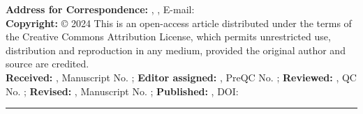 \documentclass{article} %
\begin{document}
\begin{justify} %
\fontsize{8.5}{10.2}\selectfont

\color{Light_navy_blue}\textbf{Address for Correspondence:}  
\color{Black}, ,
E-mail: \href{mailto:\VAR{email}}{} \\

\color{Light_navy_blue}\textbf{Copyright:} 
\color{Black}© 2024  This is an open-access article distributed under the terms of the Creative Commons Attribution License, which permits unrestricted use, distribution and reproduction in any medium, provided the original author and source are credited. \\

\vspace{0.1cm}
\color{Black}\textbf{Received:} , Manuscript No. ; 
\textbf{Editor assigned:} , PreQC No. ; 
\textbf{Reviewed:} , QC No. ; 
\textbf{Revised:} , Manuscript No. ; 
\textbf{Published:} , 
DOI: \href{\VAR{parentLink}}{}

\noindent\color{Light_navy_blue}\rule{\linewidth}{1pt}

\end{justify}

\label{TotPages}
\end{document}
